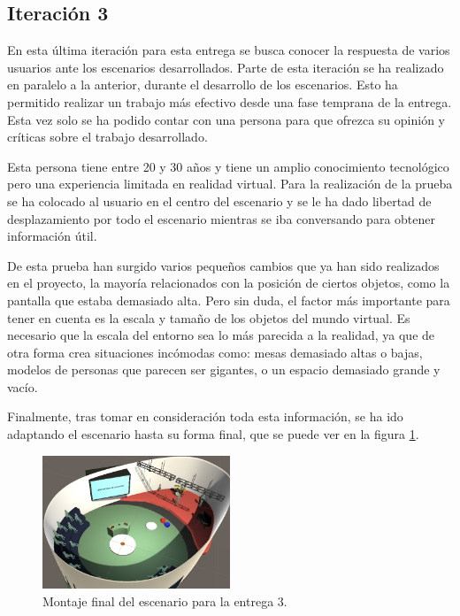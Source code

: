 
\subsection{Iteración 3}


En esta última iteración para esta entrega se busca conocer la respuesta de varios usuarios ante los escenarios desarrollados. Parte de esta iteración se ha realizado en paralelo a la anterior, durante el desarrollo de los escenarios. Esto ha permitido realizar un trabajo más efectivo desde una fase temprana de la entrega. Esta vez solo se ha podido contar con una persona para que ofrezca su opinión y críticas sobre el trabajo desarrollado. 

Esta persona tiene entre 20 y 30 años y tiene un amplio conocimiento tecnológico pero una experiencia limitada en realidad virtual. Para la realización de la prueba se ha colocado al usuario en el centro del escenario y se le ha dado libertad de desplazamiento por todo el escenario mientras se iba conversando para obtener información útil. 

De esta prueba han surgido varios pequeños cambios que ya han sido realizados en el proyecto, la mayoría relacionados con la posición de ciertos objetos, como la pantalla que estaba demasiado alta. Pero sin duda, el factor más importante para tener en cuenta es la escala y tamaño de los objetos del mundo virtual. Es necesario que la escala del entorno sea lo más parecida a la realidad, ya que de otra forma crea situaciones incómodas como: mesas demasiado altas o bajas, modelos de personas que parecen ser gigantes, o un espacio demasiado grande y vacío.

Finalmente, tras tomar en consideración toda esta información, se ha ido adaptando el escenario hasta su forma final, que se puede ver en la figura \ref{fig:E3_escenarioCompleto}.


\begin{figure}
  \centering
    \includegraphics[width=0.5\textwidth]{04.Desarrollo/03.Entrega3/03.Iteracion3_3/00.Figuras/01.unity_6.png}
    \caption{Montaje final del escenario para la entrega 3.}
    \label{fig:E3_escenarioCompleto}
\end{figure}






